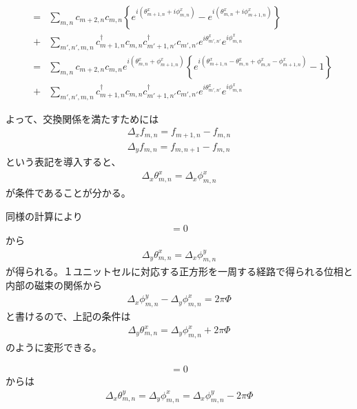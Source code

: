 \documentclass{article}
\begin{document}
\begin{eqnarray}
&=&\sum_{m,n} c_{m+2, n} c_{m,n}
\left \{e^{i\left(\theta_{m+1,n}^x+i\phi_{m,n}^x \right )} -
e^{i\left(\theta_{m,n}^x+i\phi_{m+1,n}^x \right )} \right \}  \nonumber
\\
&+& \sum_{m',n',
m,n} c_{m+1,n}^\dagger c_{m,n} c_{m'+1,n'}^\dagger 
c_{m',n'} e^{i\theta_{m',n'}^x} e^{i\phi_{m,n}^x} \nonumber \\
&=&\sum_{m,n} c_{m+2, n} c_{m,n}
 e^{i\left(\theta_{m,n}^x+\phi_{m+1,n}^x \right )}
\left \{e^{i\left(\theta_{m+1,n}^x-\theta_{m,n}^x+\phi_{m,n}^x-\phi_{m+1,n}^x
\right )} - 1\right \}  \nonumber
\\
&+& \sum_{m',n',
m,n} c_{m+1,n}^\dagger c_{m,n} c_{m'+1,n'}^\dagger 
c_{m',n'} e^{i\theta_{m',n'}^x} e^{i\phi_{m,n}^x}
\end{eqnarray}

よって、交換関係を満たすためには
\begin{eqnarray}
\Delta_x f_{m,n} =f_{m+1, n}- f_{m, n} \nonumber \\
\Delta_y f_{m,n} =f_{m, n+1}- f_{m, n}
\end{eqnarray}
という表記を導入すると、
\begin{eqnarray}
\Delta_x \theta_{m,n}^x=\Delta_x \phi_{m,n}^x
\end{eqnarray}
が条件であることが分かる。

同様の計算により
\begin{eqnarray}
[T_x^M, T_y]=0
\end{eqnarray}
から
\begin{eqnarray}
\Delta_y \theta_{m,n}^x=\Delta_x \phi_{m,n}^y
\end{eqnarray}
が得られる。１ユニットセルに対応する正方形を一周する経路で得られる位相と内部の磁束の関係から
\begin{eqnarray}
\Delta_x\phi_{m,n}^y-\Delta_y\phi_{m,n}^x=2\pi \Phi
\end{eqnarray}
と書けるので、上記の条件は
\begin{eqnarray}
\Delta_y \theta_{m,n}^x=\Delta_y \phi_{m,n}^x+2\pi\Phi
\end{eqnarray}
のように変形できる。


\begin{eqnarray}
[T_y^M, T_x]=0
\end{eqnarray}
からは
\begin{eqnarray}
\Delta_x \theta_{m,n}^y=\Delta_y\phi_{m,n}^x=\Delta_x \phi_{m,n}^y-2\pi \Phi
\end{eqnarray}
\end{document}

